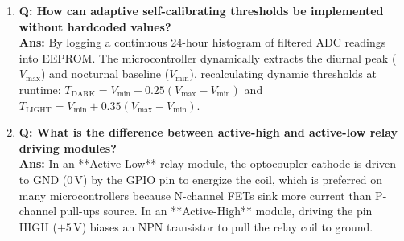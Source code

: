 \documentclass[10pt,a4paper]{article}
\begin{document}
\begin{enumerate}[leftmargin=*]
    \item \textbf{Q: How can adaptive self-calibrating thresholds be implemented without hardcoded values?}\\
    \textbf{Ans:} By logging a continuous 24-hour histogram of filtered ADC readings into EEPROM. The microcontroller dynamically extracts the diurnal peak ($V_{\max}$) and nocturnal baseline ($V_{\min}$), recalculating dynamic thresholds at runtime: $T_{\text{DARK}} = V_{\min} + 0.25(V_{\max} - V_{\min})$ and $T_{\text{LIGHT}} = V_{\min} + 0.35(V_{\max} - V_{\min})$.

    \item \textbf{Q: What is the difference between active-high and active-low relay driving modules?}\\
    \textbf{Ans:} In an **Active-Low** relay module, the optocoupler cathode is driven to GND ($0\,\text{V}$) by the GPIO pin to energize the coil, which is preferred on many microcontrollers because N-channel FETs sink more current than P-channel pull-ups source. In an **Active-High** module, driving the pin HIGH ($+5\,\text{V}$) biases an NPN transistor to pull the relay coil to ground.
\end{enumerate}
\end{document}
